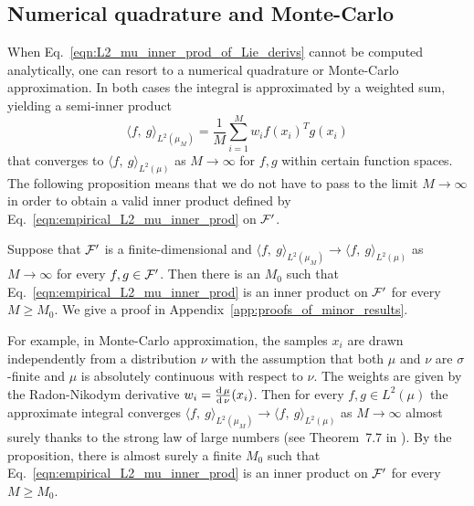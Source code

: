 \documentclass[twoside,11pt]{article}
\begin{document}
\subsection{Numerical quadrature and Monte-Carlo}
When Eq.~\ref{eqn:L2_mu_inner_prod_of_Lie_derivs} cannot be computed analytically, 
one can resort to a numerical quadrature or Monte-Carlo approximation.
In both cases the integral is approximated by a weighted sum, yielding a semi-inner product
\begin{equation}
    \langle f, \ g \rangle_{L^2(\mu_M)} = \frac{1}{M}\sum_{i=1}^M w_i f(x_i)^T g(x_i)
    \label{eqn:empirical_L2_mu_inner_prod}
\end{equation}
that converges to $\langle f, \ g \rangle_{L^2(\mu)}$ as $M\to\infty$ for $f,g$ within certain function spaces.
The following proposition means that we do not have to pass to the limit $M\to\infty$ in order to obtain a valid inner product defined by Eq.~\ref{eqn:empirical_L2_mu_inner_prod} on ${\mathcal{F}}'$.
\begin{proposition}
    \label{prop:Monte_Carlo_eventually_gives_an_inner_product}
    Suppose that ${\mathcal{F}}'$ is a finite-dimensional and $\langle f, \ g \rangle_{L^2(\mu_M)} \to \langle f, \ g \rangle_{L^2(\mu)}$ as $M\to\infty$ for every $f,g\in{\mathcal{F}}'$.
    Then there is an $M_0$ such that 
    Eq.~\ref{eqn:empirical_L2_mu_inner_prod} is an inner product on ${\mathcal{F}}'$ for every $M \geq M_0$.
    We give a proof in Appendix~\ref{app:proofs_of_minor_results}.
\end{proposition}

For example, in Monte-Carlo approximation, the samples $x_i$ are drawn independently from a distribution $\nu$ with the assumption that both $\mu$ and $\nu$ are $\sigma$-finite and $\mu$ is absolutely continuous with respect to $\nu$.
The weights are given by the Radon-Nikodym derivative $w_i = \frac{\operatorname{\mathrm{d}} \mu}{\operatorname{\mathrm{d}} \nu}(x_i)$.
Then for every $f, g\in L^2(\mu)$ the approximate integral converges $\langle f, \ g \rangle_{L^2(\mu_M)} \to \langle f, \ g \rangle_{L^2(\mu)}$ as $M\to\infty$ almost surely thanks to the strong law of large numbers (see Theorem~7.7 in \cite{Koralov2012theory}).
By the proposition, there is almost surely a finite $M_0$ such that Eq.~\ref{eqn:empirical_L2_mu_inner_prod} is an inner product on ${\mathcal{F}}'$ for every $M \geq M_0$.
\end{document}
